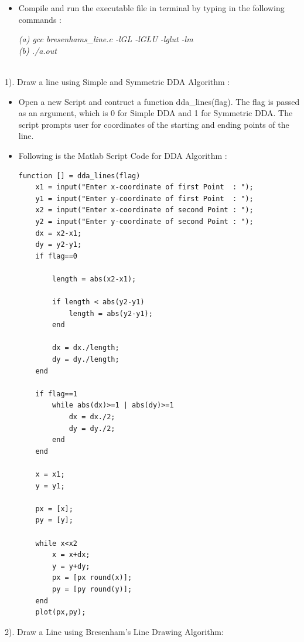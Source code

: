 \begin{itemize}
\vspace{0.5mm}

\item Compile and run the executable file in terminal by typing in the following commands :

\vspace{0.5mm} \flushleft

\textit{(a)\hspace{2mm} gcc bresenhams\_line.c -lGL -lGLU -lglut -lm}\\
\textit{(b)\hspace{2mm} ./a.out}
\vspace*{3\baselineskip}
\end{itemize}

\\
1). Draw a line using Simple and Symmetric DDA Algorithm :
\begin{itemize}

\item Open a new Script and contruct a function dda\_lines(flag). The flag is passed as an argument,
which is 0 for Simple DDA and 1 for Symmetric DDA. The script prompts user for coordinates of the
starting and ending points of the line.

\item Following is the Matlab Script Code for DDA Algorithm :
\begin{lstlisting}
function [] = dda_lines(flag)
	x1 = input("Enter x-coordinate of first Point  : ");
	y1 = input("Enter y-coordinate of first Point  : ");
	x2 = input("Enter x-coordinate of second Point : ");
	y2 = input("Enter y-coordinate of second Point : ");
	dx = x2-x1;
	dy = y2-y1;
	if flag==0
		
		length = abs(x2-x1);
		
		if length < abs(y2-y1)
			length = abs(y2-y1);
		end
		
		dx = dx./length;
		dy = dy./length;
	end

	if flag==1
		while abs(dx)>=1 | abs(dy)>=1
			dx = dx./2;
			dy = dy./2;
		end
	end

	x = x1;
	y = y1;

	px = [x];
	py = [y];
	
	while x<x2
		x = x+dx;
		y = y+dy;
		px = [px round(x)];
		py = [py round(y)];
	end
	plot(px,py);
\end{lstlisting}
\vspace*{1\baselineskip}
\end{itemize}

2). Draw a Line using Bresenham’s Line Drawing Algorithm:

